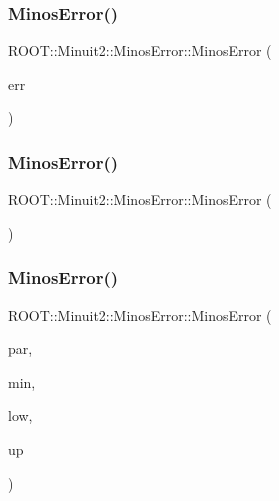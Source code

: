 \subsubsection{\texorpdfstring{MinosError()}{MinosError()}\hspace{0.1cm}{\footnotesize\ttfamily [6/9]}}
{\footnotesize\ttfamily R\+O\+O\+T\+::\+Minuit2\+::\+Minos\+Error\+::\+Minos\+Error (\begin{DoxyParamCaption}\item[{const \mbox{\hyperlink{classROOT_1_1Minuit2_1_1MinosError}{Minos\+Error}} \&}]{err }\end{DoxyParamCaption})\hspace{0.3cm}{\ttfamily [inline]}}

\mbox{\label{classROOT_1_1Minuit2_1_1MinosError_a5cb0fad5d73d20905a57fb1c505c9fd2}} 
\subsubsection{\texorpdfstring{MinosError()}{MinosError()}\hspace{0.1cm}{\footnotesize\ttfamily [7/9]}}
{\footnotesize\ttfamily R\+O\+O\+T\+::\+Minuit2\+::\+Minos\+Error\+::\+Minos\+Error (\begin{DoxyParamCaption}{ }\end{DoxyParamCaption})\hspace{0.3cm}{\ttfamily [inline]}}

\mbox{\label{classROOT_1_1Minuit2_1_1MinosError_a400609986f7b4e3a93eab1a35e1f33ce}} 
\subsubsection{\texorpdfstring{MinosError()}{MinosError()}\hspace{0.1cm}{\footnotesize\ttfamily [8/9]}}
{\footnotesize\ttfamily R\+O\+O\+T\+::\+Minuit2\+::\+Minos\+Error\+::\+Minos\+Error (\begin{DoxyParamCaption}\item[{unsigned int}]{par,  }\item[{double}]{min,  }\item[{const \mbox{\hyperlink{classROOT_1_1Minuit2_1_1MnCross}{Mn\+Cross}} \&}]{low,  }\item[{const \mbox{\hyperlink{classROOT_1_1Minuit2_1_1MnCross}{Mn\+Cross}} \&}]{up }\end{DoxyParamCaption})\hspace{0.3cm}{\ttfamily [inline]}}

